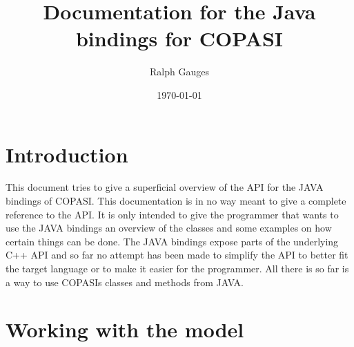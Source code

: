 \documentclass[a4,10pt]{article}
\begin{document}

\title{Documentation for the Java bindings for COPASI}
\author{Ralph Gauges}
\date{\today}
\maketitle
\parindent=0cm
\section{Introduction}
This document tries to give a superficial overview of the API for the JAVA bindings of COPASI. This documentation is in no way meant to give a complete reference to the API. It is only intended to give the programmer that wants to use the JAVA bindings an overview of the classes and some examples on how certain things can be done.
The JAVA bindings expose parts of the underlying C++ API and so far no attempt has been made to simplify the API to better fit the target language or to make it easier for the programmer. All there is so far is a way to use COPASIs classes and methods from JAVA.

\section{Working with the model}
\end{document}

